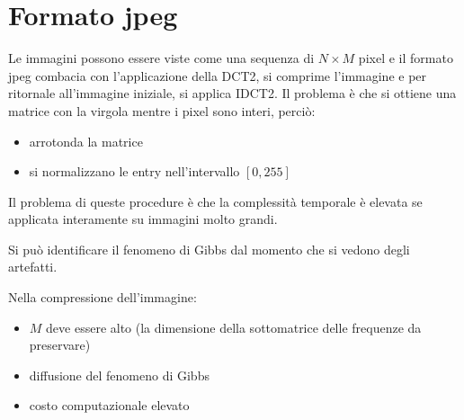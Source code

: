 \chapter{Formato jpeg}
Le immagini possono essere viste come una sequenza di $N \times M$ pixel e 
il formato jpeg combacia con l'applicazione della DCT2, si comprime l'immagine 
e per ritornale all'immagine iniziale, si applica IDCT2. Il problema è che si ottiene 
una matrice con la virgola mentre i pixel sono interi, perciò:
\begin{itemize}
    \item arrotonda la matrice
    \item si normalizzano le entry nell'intervallo $[0,255]$ 
\end{itemize}

\begin{nota}
    Il problema di queste procedure è che la complessità temporale è elevata se 
    applicata interamente su immagini molto grandi.
\end{nota}

\begin{nota}
    Si può identificare il fenomeno di Gibbs dal momento che si vedono degli artefatti.
\end{nota}

Nella compressione dell'immagine:
\begin{itemize}
    \item $M$ deve essere alto (la dimensione della sottomatrice delle frequenze 
    da preservare)
    \item diffusione del fenomeno di Gibbs
    \item costo computazionale elevato
\end{itemize}